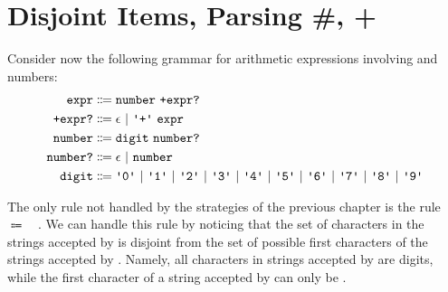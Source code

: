 \chapter{Disjoint Items, Parsing \#, +} \label{ch:disjoint}

  Consider now the following grammar for arithmetic expressions involving \terminal{+} and numbers:
  \begin{align*}
    \nt{expr} & \Coloneqq \nt{number}~\nt{+expr?} \\
    \nt{+expr?} & \Coloneqq \nt{$\epsilon$}~|~\terminal{+}~\nt{expr} \\
    \nt{number} & \Coloneqq \nt{digit}~\nt{number?} \\
    \nt{number?} & \Coloneqq \epsilon~|~\nt{number} \\
    \nt{digit} & \Coloneqq \terminal{0}~|~\terminal{1}~|~\terminal{2}~|~\terminal{3}~|~\terminal{4}~|~\terminal{5}~|~\terminal{6}~|~\terminal{7}~|~\terminal{8}~|~\terminal{9}
  \end{align*}
  
  The only rule not handled by the strategies of the previous chapter is the rule ~$\Coloneqq$~~.  We can handle this rule by noticing that the set of characters in the strings accepted by  is disjoint from the set of possible first characters of the strings accepted by .  Namely, all characters in strings accepted by  are digits, while the first character of a string accepted by  can only be \terminal{+}.
  
